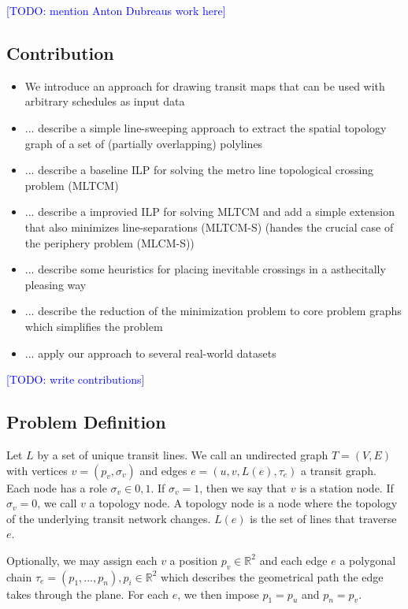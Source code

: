 \documentclass{llncs}
\newcommand\todo[1]{\textcolor{blue}{[TODO: #1]}}
\begin{document}
\todo{mention Anton Dubreaus work here}

%
\subsection{Contribution}\label{SEC:contrib}
%
\begin{itemize}
	\item We introduce an approach for drawing transit maps that can be used with arbitrary schedules as input data
	\item ... describe a simple line-sweeping approach to extract the spatial topology graph of a set of (partially overlapping) polylines
	\item ... describe a baseline ILP for solving the metro line topological crossing problem (MLTCM)
	\item ... describe a improvied ILP for solving MLTCM and add a simple extension that also minimizes line-separations (MLTCM-S) (handes the crucial case of the periphery problem (MLCM-S))
	\item ... describe some heuristics for placing inevitable crossings in a asthecitally pleasing way
	\item ... describe the reduction of the minimization problem to core problem graphs which simplifies the problem
	\item ... apply our approach to several real-world datasets
\end{itemize}

\todo{write contributions}

%
\subsection{Problem Definition}\label{SEC:def}
%
Let $L$ by a set of unique transit lines. We call an undirected graph $T = (V, E)$ with vertices $v = (p_v, \sigma_v)$ and edges $e = (u, v, L(e), \tau_e)$ a transit graph. Each node has a role $\sigma_v \in {0, 1}$. If $\sigma_v = 1$, then we say that $v$ is a station node. If $\sigma_v = 0$, we call $v$ a topology node. A topology node is a node where the topology of the underlying transit network changes. $L(e)$ is the set of lines that traverse $e$.

Optionally, we may assign each $v$ a position $p_v \in \mathbb{R}^2$ and each edge $e$ a polygonal chain $\tau_e = (p_1, ..., p_n), p_i \in \mathbb{R}^2$ which describes the geometrical path the edge takes through the plane. For each $e$, we then impose $p_1 = p_u$ and $p_n = p_v$.
\end{document}
